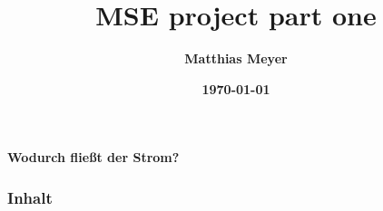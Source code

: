 \documentclass[xcolor=dvipsnames,envcountsect]{beamer}
\title[MSE project part one]{MSE project part one}
\author [Matthias Meyer]{\textbf{Matthias Meyer}}
\institute[OST] {{--------------}\\[1em]
\texttt{[image: ./Figures/Sonova\_Tagline\_RGB2.jpg]}}
\date[\today]{\footnotesize \textbf{\today}}
\begin{document}
\begin{frame}
\center
\textbf{Wodurch fließt der Strom?}

\end{frame}
\begin{frame}{\frametitle{Inhalt}\tableofcontents}\end{frame}
\end{document}
